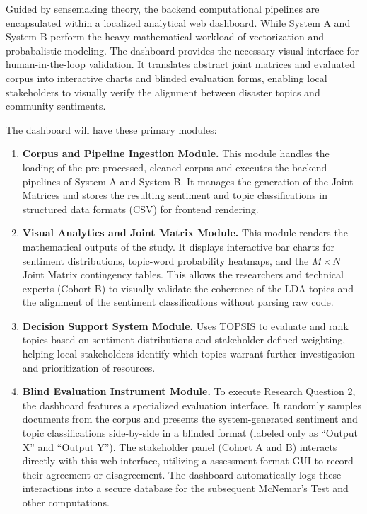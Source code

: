 Guided by sensemaking theory, the backend computational pipelines are encapsulated within a localized analytical web dashboard. While System A and System B perform the heavy mathematical workload of vectorization and probabalistic modeling. The dashboard provides the necessary visual interface for human-in-the-loop validation. It translates abstract joint matrices and evaluated corpus into interactive charts and blinded evaluation forms, enabling local stakeholders to visually verify the alignment between disaster topics and community sentiments.

The dashboard will have these primary modules:
\begin{enumerate}
	\item \textbf{Corpus and Pipeline Ingestion Module.} This module handles 
	the loading of the pre-processed, cleaned corpus and executes the backend 
	pipelines of System A and System B. It manages the generation of the 
	Joint Matrices and stores the resulting sentiment and topic classifications 
	in structured data formats (CSV) for frontend rendering.
	
	\item \textbf{Visual Analytics and Joint Matrix Module.} This module 
	renders the mathematical outputs of the study. It displays interactive 
	bar charts for sentiment distributions, topic-word probability heatmaps, 
	and the $M \times N$ Joint Matrix contingency tables. This allows the 
	researchers and technical experts (Cohort B) to visually validate the 
	coherence of the LDA topics and the alignment of the sentiment 
	classifications without parsing raw code.
	
	\item \textbf{Decision Support System Module.} Uses TOPSIS to evaluate and rank topics based on sentiment distributions and stakeholder-defined weighting, helping local stakeholders identify which topics warrant further investigation and prioritization of resources.

	\item \textbf{Blind Evaluation Instrument Module.} To execute Research
	Question 2, the dashboard features a specialized evaluation interface. 
	It randomly samples documents from the corpus and presents the 
	system-generated sentiment and topic classifications side-by-side in a 
	blinded format (labeled only as ``Output X'' and ``Output Y''). The 
	stakeholder panel (Cohort A and B) interacts directly with this web 
	interface, utilizing a assessment format GUI to record their agreement or 
	disagreement. The dashboard automatically logs these interactions into 
	a secure database for the subsequent McNemar's Test and other computations.
\end{enumerate}

